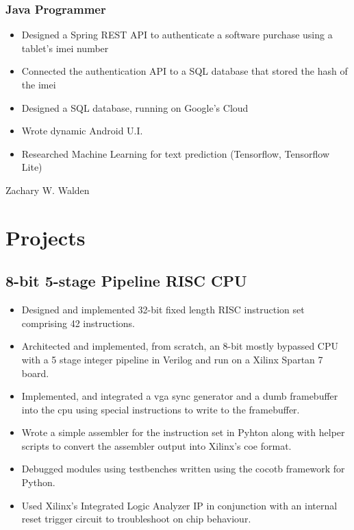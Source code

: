 \documentclass{article}
\begin{document}
\begin{spacing}{.5}
		\subsubsection{\large{Java Programmer}}
			\begin{itemize}[label=--,itemsep=-.65ex]
				\item \large{Designed a Spring REST API to authenticate a software purchase using a tablet's imei number}
				\item \large{Connected the authentication API to a SQL database that stored the hash of the imei}
				\item \large{Designed a SQL database, running on Google's Cloud}
				\item \large{Wrote dynamic Android U.I.}
				\item \large{Researched Machine Learning for text prediction} \small{(Tensorflow, Tensorflow Lite)}
			\end{itemize}

\newpage

\begin{center}
	\begin{huge}
		Zachary W. Walden\\
	\end{huge}
\end{center}

\section{Projects}
	\subsection{8-bit 5-stage Pipeline RISC CPU \hfill {}}
		\begin{itemize}[label=--,itemsep=-.35ex]
			\item \large{Designed and implemented 32-bit fixed length RISC instruction set comprising 42 instructions.}
			\item \large{Architected and implemented, from scratch, an 8-bit mostly bypassed CPU with a 5 stage integer pipeline in Verilog and run on a Xilinx Spartan 7 board.}
			\item \large{Implemented, and integrated a vga sync generator and a dumb framebuffer into the cpu using special instructions to write to the framebuffer.}
			\item \large{Wrote a simple assembler for the instruction set in Pyhton along with helper scripts to convert the assembler output into Xilinx's coe format.}
			\item \large{Debugged modules using testbenches written using the cocotb framework for Python.}
			\item \large{Used Xilinx's Integrated Logic Analyzer IP in conjunction with an internal reset trigger circuit to troubleshoot on chip behaviour.}
		\end{itemize}

\end{spacing}
\end{document}
